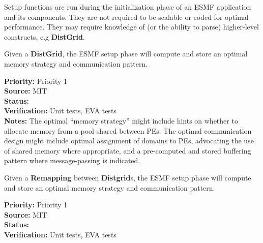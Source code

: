 

Setup functions are run during the initialization phase of an ESMF
application and its components. They are not required to be scalable
or coded for optimal performance. They may require knowledge of (or
the ability to parse) higher-level constructs, e.g \textbf{DistGrid}.


Given a \textbf{DistGrid}, the ESMF setup phase will compute and store
an optimal memory strategy and communication pattern.

\begin{reqlist}
  {\bf Priority:} Priority 1 \\
  {\bf Source:}  MIT \\
  {\bf Status:}  \\
  {\bf Verification:} Unit tests, EVA tests \\
  {\bf Notes:} The optimal ``memory strategy'' might include hints on
  whether to allocate memory from a pool shared between PEs. The
  optimal communication design might include optimal assignment of
  domains to PEs, advocating the use of shared memory where
  appropriate, and a pre-computed and stored buffering pattern where
  message-passing is indicated.
\end{reqlist}


Given a \textbf{Remapping} between \textbf{Distgrid}s, the ESMF setup
phase will compute and store an optimal memory strategy and
communication pattern.

\begin{reqlist}
{\bf Priority:} Priority 1 \\
{\bf Source:}  MIT \\
{\bf Status:}  \\
{\bf Verification:} Unit tests, EVA tests \\
\end{reqlist}


